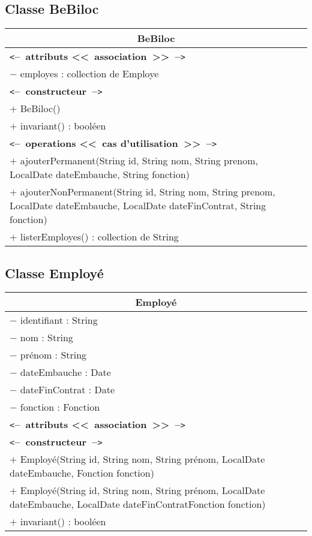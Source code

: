 \documentclass[11pt,article]{article}
\newcommand{\cmt}[1]{\texttt{<}\textbf{--~#1~--}\texttt{>}}
\begin{document}
\subsection{Classe \textsf{BeBiloc}}

\begin{center}
\begin{longtable}{|p{15cm}|} 
\hline
\multicolumn{1}{|c|}{{\Large \textsf{BeBiloc}}} \\
\hline
\cmt{attributs <<~association~>>}\\
$-$ employes : collection de Employe \\
\hline
\cmt{constructeur} \\
$+$ BeBiloc()\\
$+$ invariant() : booléen\\
\cmt{operations <<~cas d'utilisation~>>} \\
$+$ ajouterPermanent(String id, String nom, String prenom, LocalDate dateEmbauche, String fonction) \\
$+$ ajouterNonPermanent(String id, String nom, String prenom,
LocalDate dateEmbauche, LocalDate dateFinContrat, String fonction) \\
$+$ listerEmployes() : collection de String \\
\hline  
\end{longtable}%
\end{center}

\subsection{Classe \textsf{Employé}}

\begin{center}
\begin{longtable}{|p{15cm}|} 
\hline
\multicolumn{1}{|c|}{{\Large \textsf{Employé}}} \\
\hline
$-$ identifiant : String \\
$-$ nom : String \\
$-$ prénom : String \\
$-$ dateEmbauche : Date \\
$-$ dateFinContrat : Date \\
$-$ fonction : Fonction \\
\cmt{attributs <<~association~>>}\\
\hline
\cmt{constructeur} \\
$+$ Employé(String id, String nom, String prénom, LocalDate
dateEmbauche, Fonction fonction)\\
$+$ Employé(String id, String nom, String prénom, LocalDate
dateEmbauche, LocalDate dateFinContratFonction fonction)\\
$+$ invariant() : booléen\\
\hline  
\end{longtable}%
\end{center}
\end{document}
